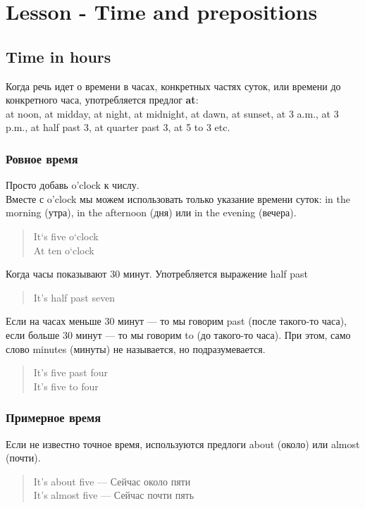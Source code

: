 \section{Lesson - Time and prepositions}

 \subsection{Time in hours}
 Когда речь идет о времени в часах, конкретных частях суток, или времени до конкретного часа, употребляется предлог \textbf{at}:\\
 at noon, at midday, at night, at midnight, at dawn, at sunset, at 3 a.m., at 3 p.m., at half past 3, at quarter past 3, at 5 to 3 etc.
 
 \subsubsection{Ровное время}
 Просто добавь o’clock к числу.\\
 Вместе с o’clock мы можем использовать только указание времени суток: in the morning (утра), in the afternoon (дня) или in the evening (вечера). 
 
	\begin{quote}
		It`s five o`clock\\
		At ten o`clock
	\end{quote}

Когда часы показывают 30 минут. Употребляется выражение half past
\begin{quote}
	It’s half past seven
\end{quote}

Если на часах меньше 30 минут — то мы говорим past (после такого-то часа), если больше 30 минут — то мы говорим to (до такого-то часа). При этом, само слово minutes (минуты) не называется, но подразумевается.

\begin{quote}
	It’s five past four\\
	It’s five to four
\end{quote}

\subsubsection{Примерное время}
Если не известно точное время, используются предлоги about (около) или almost (почти). 
\begin{quote}
	It’s about five — Сейчас около пяти\\
	It’s almost five — Сейчас почти пять 
\end{quote}

